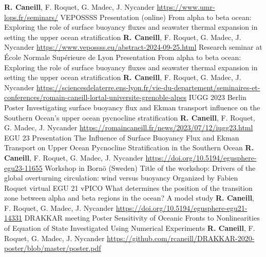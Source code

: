 \documentclass[11pt,a4paper,roman]{moderncv}
\begin{document}
        {\textbf{R. Caneill}, F. Roquet, G. Madec, J. Nycander}
        {\href{https://www.umr-lops.fr/seminars/}{https://www.umr-lops.fr/seminars/}}
        {VEPOSSSS}
        {Presentation (online)}
        {From alpha to beta ocean: Exploring the role of surface buoyancy fluxes and seawater thermal expansion in setting the upper ocean stratification}
        {\textbf{R. Caneill}, F. Roquet, G. Madec, J. Nycander}
        {\href{https://www.vepossss.eu/abstract-2024-09-25.html}{https://www.vepossss.eu/abstract-2024-09-25.html}}
        {Research seminar at École Normale Supérieure de Lyon}
        {Presentation}
        {From alpha to beta ocean: Exploring the role of surface buoyancy fluxes and seawater thermal expansion in setting the upper ocean stratification}
        {\textbf{R. Caneill}, F. Roquet, G. Madec, J. Nycander}
        {\href{https://sciencesdelaterre.ens-lyon.fr/vie-du-departement/seminaires-et-conferences/romain-caneill-lortal-universite-grenoble-alpes}{https://sciencesdelaterre.ens-lyon.fr/vie-du-departement/seminaires-et-conferences/romain-caneill-lortal-universite-grenoble-alpes}} 
        {IUGG 2023 Berlin}
        {Poster}
        {Investigating surface buoyancy flux and Ekman transport influence on the Southern Ocean's upper ocean pycnocline stratification}
        {\textbf{R. Caneill}, F. Roquet, G. Madec, J. Nycander}
        {\href{https://romaincaneill.fr/news/2023/07/12/iugg23.html}{https://romaincaneill.fr/news/2023/07/12/iugg23.html}}
        {EGU 23}
        {Presentation}
        {The Influence of Surface Buoyancy Flux and Ekman Transport on Upper Ocean Pycnocline Stratification in the Southern Ocean}
        {\textbf{R. Caneill}, F. Roquet, G. Madec, J. Nycander}
        {\href{https://doi.org/10.5194/egusphere-egu23-11655}{https://doi.org/10.5194/egusphere-egu23-11655}}
        {Workshop in Bornö (Sweden)}
        {Title of the workshop:
        Drivers of the global overturning circulation: wind versus buoyancy}
        {Organized by Fabien Roquet}
        {}{}
        {virtual EGU 21}
        {vPICO}
        {What determines the position of the transition zone between alpha and beta regions in the ocean? A model study}
        {\textbf{R. Caneill}, F. Roquet, G. Madec, J. Nycander}
        {\href{https://doi.org/10.5194/egusphere-egu21-14331}{https://doi.org/10.5194/egusphere-egu21-14331}}
        {DRAKKAR meeting}
        {Poster}
        {Sensitivity of Oceanic Fronts to Nonlinearities of Equation of State Investigated Using Numerical Experiments}
        {\textbf{R. Caneill}, F. Roquet, G. Madec, J. Nycander}
        {\href{https://github.com/rcaneill/DRAKKAR-2020-poster/blob/master/poster.pdf}{https://github.com/rcaneill/DRAKKAR-2020-poster/blob/master/poster.pdf}}
\end{document}
